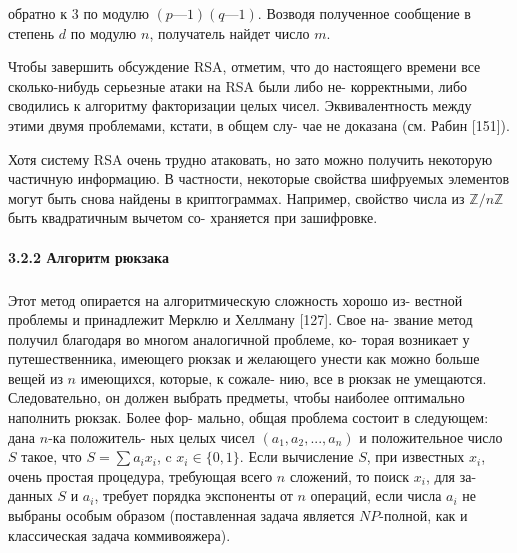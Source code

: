 \noindent обратно к $3$ по модулю $(p — 1)(q — 1)$. Возводя полученное сообщение в\linebreak
степень $d$ по модулю $n$, получатель найдет число $m$.

Чтобы завершить обсуждение RSA, отметим, что до настоящего\linebreak
времени все сколько-нибудь серьезные атаки на RSA были либо не­-\linebreak
корректными, либо сводились к алгоритму факторизации целых чисел.\linebreak
Эквивалентность между этими двумя проблемами, кстати, в общем слу­-\linebreak
чае не доказана (см. Рабин [151]).

Хотя систему RSA очень трудно атаковать, но зато можно получить\linebreak
некоторую частичную информацию. В частности, некоторые свойства\linebreak
шифруемых элементов могут быть снова найдены в криптограммах.\linebreak
Например, свойство числа из $\mathbb{Z}/n\mathbb{Z}$ быть квадратичным вычетом со-\linebreak
храняется при зашифровке.

\paragraph{3.2.2 Алгоритм рюкзака}
\subparagraph{}Этот метод опирается на алгоритмическую сложность хорошо из-\linebreak 
вестной проблемы и принадлежит Мерклю и Хеллману [127]. Свое на­-\linebreak
звание метод получил благодаря во многом аналогичной проблеме, ко-\linebreak
торая возникает у путешественника, имеющего рюкзак и желающего\linebreak
унести как можно больше вещей из $n$ имеющихся, которые, к сожале-\linebreak
­нию, все в рюкзак не умещаются. Следовательно, он должен выбрать\linebreak
предметы, чтобы наиболее оптимально наполнить рюкзак. Более фор-\linebreak
­мально, общая проблема состоит в следующем: дана $n$-ка положитель-\linebreak
ных целых чисел $(a_1, a_2,...,a_n)$ и положительное число $S$ такое, что\linebreak
$S=\sum a_i x_i$, c $x_i \in \{0, 1\}$. Если вычисление $S$, при известных $x_i$, очень\linebreak
простая процедура, требующая всего $n$ сложений, то поиск $x_i$, для за-\linebreak
данных $S$ и $a_i$, требует порядка экспоненты от $n$ операций, если числа $a_i$\linebreak
не выбраны особым образом (поставленная задача является $N P$-полной,\linebreak
как и классическая задача коммивояжера).

